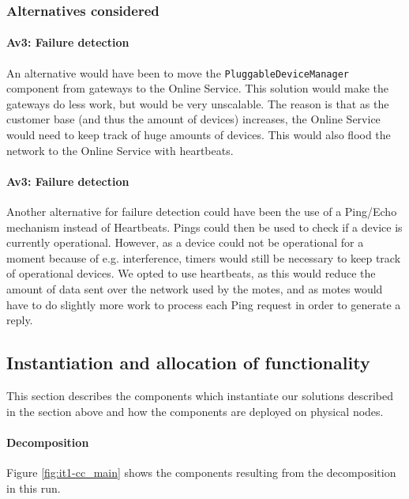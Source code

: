     \subsubsection{Alternatives considered}
        \paragraph{Av3: Failure detection}
            An alternative would have been to move the \texttt{PluggableDeviceManager}
            component from gateways to the Online Service. This solution would make the
            gateways do less work, but would be very unscalable. The reason is
            that as the customer base (and thus the amount of devices) increases,
            the Online Service would need to keep track of huge amounts of devices.
            This would also flood the network to the Online Service with heartbeats.

        \paragraph{Av3: Failure detection}
            Another alternative for failure detection could have been the use of
            a Ping/Echo mechanism instead of Heartbeats. Pings could then be used
            to check if a device is currently operational. However, as a device could
            not be operational for a moment because of e.g. interference, timers
            would still be necessary to keep track of operational devices. We opted
            to use heartbeats, as this would reduce the amount of data sent over
            the network used by the motes, and as motes would have to do slightly
            more work to process each Ping request in order to generate a reply.


\subsection{Instantiation and allocation of functionality}
    This section describes the components which instantiate our solutions described
    in the section above and how the components are deployed on physical nodes.

    \paragraph{Decomposition}
        Figure \ref{fig:it1-cc_main} shows the components resulting from the
        decomposition in this run.

